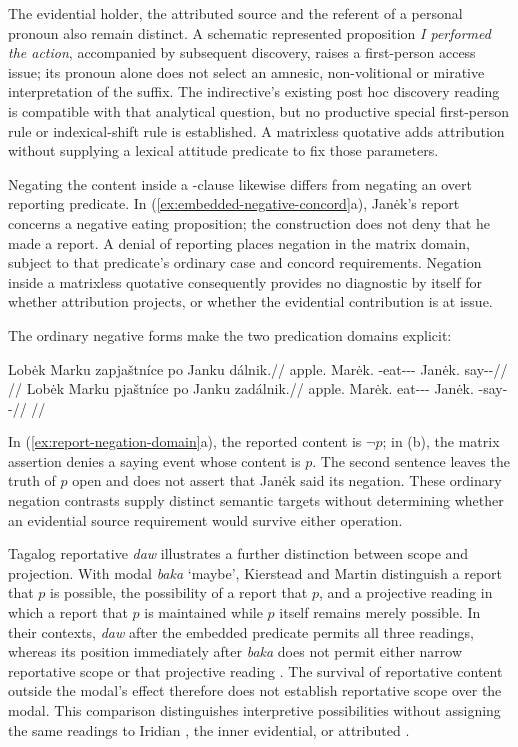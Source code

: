 The evidential holder, the attributed source and the referent of a personal
pronoun also remain distinct. A schematic represented proposition
\textit{I performed the action}, accompanied by subsequent discovery,
raises a first-person access issue; its pronoun alone does not select
an amnesic, non-volitional or mirative interpretation of the suffix.
The indirective's existing post hoc discovery reading is compatible with
that analytical question, but no productive special first-person rule or
indexical-shift rule is established. A matrixless quotative adds
attribution without supplying a lexical attitude predicate to fix those
parameters.

Negating the content inside a -clause likewise differs from
negating an overt reporting predicate. In
(\ref{ex:embedded-negative-concord}a), Janėk's report concerns a
negative eating proposition; the construction does not deny that he made
a report. A denial of reporting places negation in the matrix domain,
subject to that predicate's ordinary case and concord requirements.
Negation inside a matrixless quotative consequently provides no diagnostic
by itself for whether attribution projects, or whether the evidential
contribution is at issue.

The ordinary negative forms make the two predication domains explicit:

\pex\label{ex:report-negation-domain}%
\a
\begingl
\gla Lobėk Marku zapjaštníce po Janku dálnik.//
\glb apple.\Dir{} Marėk.\Trs{} \Neg{}-eat-\Trs{}-\Pf{}-\Lnk{} \Compl{} Janėk.\Trs{} say-\Trs{}-\Pf{}//
\glft {}//
\endgl
\a
\begingl
\gla Lobėk Marku pjaštníce po Janku zadálnik.//
\glb apple.\Dir{} Marėk.\Trs{} eat-\Trs{}-\Pf{}-\Lnk{} \Compl{} Janėk.\Trs{} \Neg{}-say-\Trs{}-\Pf{}//
\glft {}//
\endgl
\xe

In (\ref{ex:report-negation-domain}a), the reported content is $\neg p$;
in (b), the matrix assertion denies a saying event whose content is $p$.
The second sentence leaves the truth of $p$ open and does not assert that
Janėk said its negation. These ordinary negation contrasts supply distinct
semantic targets without determining whether an evidential source
requirement would survive either operation.

Tagalog reportative \textit{daw} illustrates a further distinction between
scope and projection. With modal \textit{baka} `maybe', Kierstead and
Martin distinguish a report that $p$ is possible, the possibility of a
report that $p$, and a projective reading in which a report that $p$
is maintained while $p$ itself remains merely possible. In their
contexts, \textit{daw} after the embedded predicate permits all three
readings, whereas its position immediately after \textit{baka} does not
permit either narrow reportative scope or that projective reading
\cite[§2, especially Table~1, pp.~330--332]{kiersteadmartin2012}.
The survival of reportative content outside the modal's effect therefore
does not establish reportative scope over the modal. This comparison
distinguishes interpretive possibilities without assigning the same
readings to Iridian , the inner evidential, or attributed
.

